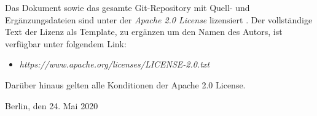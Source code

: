 {	Das Dokument sowie das gesamte Git-Repository mit Quell- und Erg\"anzungsdateien sind unter der \textit{Apache 2.0 License} lizensiert \cite{Apa04}.
	Der vollst\"andige Text der Lizenz als Template, zu erg\"anzen um den Namen des Autors, ist verf\"ugbar unter folgendem Link:
	\begin{itemize}
		\item[] \textit{https://www.apache.org/licenses/LICENSE-2.0.txt}
	\end{itemize}
	
	Dar\"uber hinaus gelten alle Konditionen der Apache 2.0 License.
	
	\vspace{3cm}
	
	\raggedright{Berlin, den 24. Mai 2020}
	
}